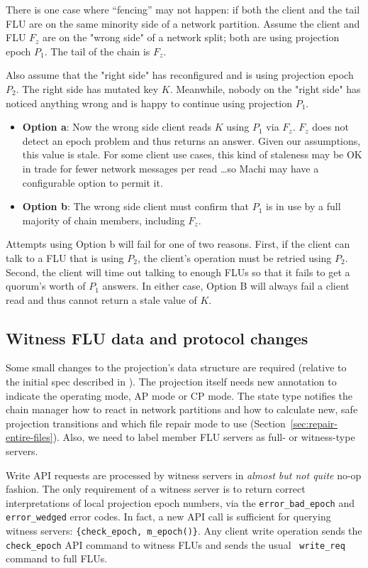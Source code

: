 \documentclass[preprint,10pt]{sigplanconf}
\begin{document}
There is one case where ``fencing'' may not happen: if both the client
and the tail FLU are on the same minority side of a network partition.
Assume the client and FLU $F_z$ are on the "wrong side" of a network
split; both are using projection epoch $P_1$.  The tail of the
chain is $F_z$.

Also assume that the "right side" has reconfigured and is using
projection epoch $P_2$.  The right side has mutated key $K$.  Meanwhile,
nobody on the "right side" has noticed anything wrong and is happy to
continue using projection $P_1$.

\begin{itemize}
\item {\bf Option a}: Now the wrong side client reads $K$ using $P_1$ via
  $F_z$.  $F_z$ does not detect an epoch problem and thus returns an
  answer.  Given our assumptions, this value is stale.  For some
  client use cases, this kind of staleness may be OK in trade for
  fewer network messages per read \ldots so Machi may
  have a configurable option to permit it.
\item {\bf Option b}: The wrong side client must confirm that $P_1$ is
  in use by a full majority of chain members, including $F_z$.
\end{itemize}

Attempts using Option b will fail for one of two reasons.  First, if
the client can talk to a FLU that is using $P_2$, the client's
operation must be retried using $P_2$.  Second, the client will time
out talking to enough FLUs so that it fails to get a quorum's worth of
$P_1$ answers.  In either case, Option B will always fail a client
read and thus cannot return a stale value of $K$.

\subsection{Witness FLU data and protocol changes}

Some small changes to the projection's data structure
are required (relative to the initial spec described in
\cite{machi-design}).  The projection itself
needs new annotation to indicate the operating mode, AP mode or CP
mode.  The state type notifies the chain manager how to
react in network partitions and how to calculate new, safe projection
transitions and which file repair mode to use
(Section~\ref{sec:repair-entire-files}).
Also, we need to label member FLU servers as full- or
witness-type servers.

Write API requests are processed by witness servers in {\em almost but
  not quite} no-op fashion.  The only requirement of a witness server
is to return correct interpretations of local projection epoch
numbers, via the {\tt error\_bad\_epoch} and {\tt error\_wedged} error
codes.  In fact, a new API call is sufficient for querying witness
servers: {\tt \{check\_epoch, m\_epoch()\}}.
Any client write operation sends the {\tt
  check\_\-epoch} API command to witness FLUs and sends the usual {\tt
  write\_\-req} command to full FLUs.
\end{document}
